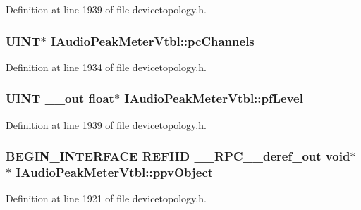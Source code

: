 Definition at line 1939 of file devicetopology.\+h.

\subsubsection[{\texorpdfstring{pc\+Channels}{pcChannels}}]{ {\bf U\+I\+NT}$\ast$ I\+Audio\+Peak\+Meter\+Vtbl\+::pc\+Channels}\hypertarget{struct_i_audio_peak_meter_vtbl_aac7e84e32369101dab4bc0046996761d}{}\label{struct_i_audio_peak_meter_vtbl_aac7e84e32369101dab4bc0046996761d}


Definition at line 1934 of file devicetopology.\+h.

\subsubsection[{\texorpdfstring{pf\+Level}{pfLevel}}]{ {\bf U\+I\+NT} {\bf \+\_\+\+\_\+out} float$\ast$ I\+Audio\+Peak\+Meter\+Vtbl\+::pf\+Level}\hypertarget{struct_i_audio_peak_meter_vtbl_a53c2eccadec601ae9f46dc1dae997985}{}\label{struct_i_audio_peak_meter_vtbl_a53c2eccadec601ae9f46dc1dae997985}


Definition at line 1939 of file devicetopology.\+h.

\subsubsection[{\texorpdfstring{ppv\+Object}{ppvObject}}]{\setlength{\rightskip}{0pt plus 5cm}B\+E\+G\+I\+N\+\_\+\+I\+N\+T\+E\+R\+F\+A\+CE {\bf R\+E\+F\+I\+ID} {\bf \+\_\+\+\_\+\+R\+P\+C\+\_\+\+\_\+deref\+\_\+out} {\bf void}$\ast$$\ast$ I\+Audio\+Peak\+Meter\+Vtbl\+::ppv\+Object}\hypertarget{struct_i_audio_peak_meter_vtbl_a23f7e6ad8d28bb683f7690dd20da96a3}{}\label{struct_i_audio_peak_meter_vtbl_a23f7e6ad8d28bb683f7690dd20da96a3}


Definition at line 1921 of file devicetopology.\+h.


